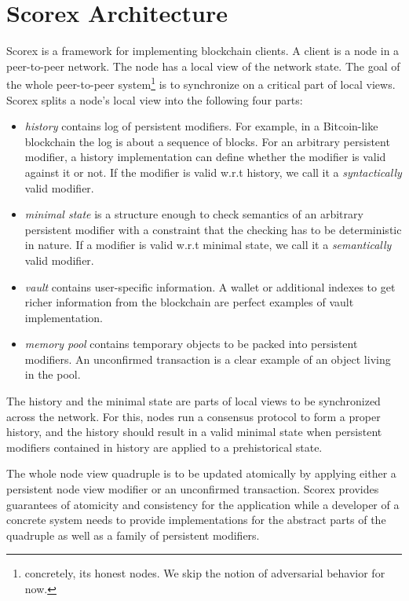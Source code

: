 
\section{Scorex Architecture}
\label{sec:scorex}

Scorex is a framework for implementing blockchain clients. A client is a node in a peer-to-peer network. The node has a local view of the network state. The goal of the whole peer-to-peer system\footnote{concretely, its honest nodes. We skip the notion of adversarial behavior for now.} is to synchronize on a critical part of local views. Scorex splits a node's local view into the following four parts: 

\begin{itemize}
\item{\em history} contains log of persistent modifiers. For example, in a Bitcoin-like blockchain the log is about a sequence of blocks. For an arbitrary persistent modifier, a history implementation can define whether the modifier is valid against it or not.
If the modifier is valid w.r.t history, we call it a {\em syntactically} valid modifier.   
\item{\em minimal state} is a structure enough to check semantics of an arbitrary persistent modifier with a constraint that the checking has to be deterministic in nature. If a modifier is valid w.r.t minimal state, we call it a {\em semantically} valid modifier.
\item{\em vault} contains user-specific information. A wallet or additional indexes to get richer information from the blockchain are perfect examples of vault implementation. 
\item{\em memory pool} contains temporary objects to be packed into persistent modifiers. An unconfirmed transaction is a clear example of an object living in the pool.
\end{itemize}

The history and the minimal state are parts of local views to be synchronized across the network. For this, nodes run a consensus protocol to form a proper history, and the history should result in a valid minimal state when persistent modifiers contained in history are applied to a prehistorical state.

The whole node view quadruple is to be updated atomically by applying either a persistent node view modifier or an unconfirmed transaction. Scorex provides guarantees of atomicity and consistency for the application while a developer of a concrete system needs to provide implementations for the abstract parts of the quadruple as well as a family of persistent modifiers.

